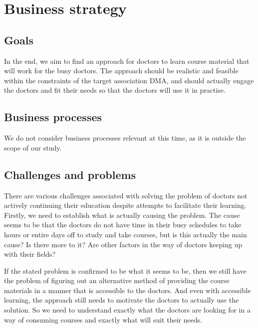 \section{Business strategy}
\subsection{Goals}
In the end, we aim to find an approach for doctors to learn course material that will work for the busy doctors. The approach should be realistic and feasible within the constraints of the target association DMA, and should actually engage the doctors and fit their needs so that the doctors will use it in practise.

\subsection{Business processes}
We do not consider business processes relevant at this time, as it is outside the scope of our study.

\subsection{Challenges and problems}
There are various challenges associated with solving the problem of doctors not actively continuing their education despite attempts to facilitate their learning. Firstly, we need to establish what is actually causing the problem. The cause seems to be that the doctors do not have time in their busy schedules to take hours or entire days off to study and take courses, but is this actually the main cause? Is there more to it? Are other factors in the way of doctors keeping up with their fields?

If the stated problem is confirmed to be what it seems to be, then we still have the problem of figuring out an alternative method of providing the course materials in a manner that is accessible to the doctors. And even with accessible learning, the approach still needs to motivate the doctors to actually use the solution. So we need to understand exactly what the doctors are looking for in a way of consuming courses and exactly what will suit their needs.
